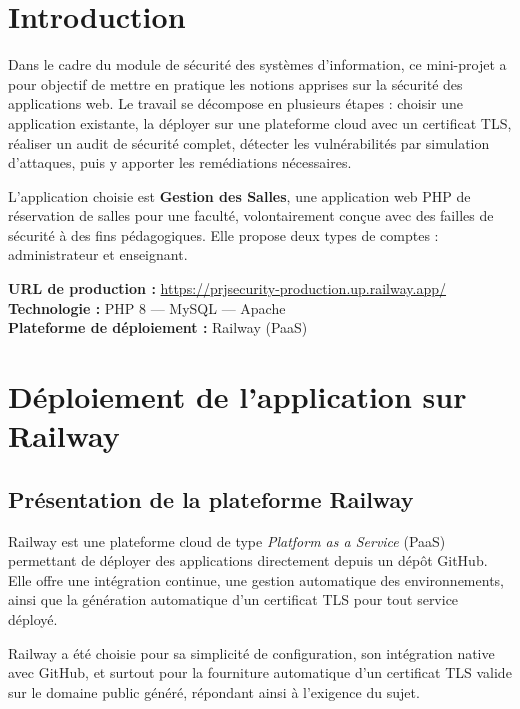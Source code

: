 ﻿\documentclass[12pt,a4paper]{report}
\begin{document}
\chapter*{Introduction}

Dans le cadre du module de sécurité des systèmes d'information, ce mini-projet a pour objectif
de mettre en pratique les notions apprises sur la sécurité des applications web. Le travail se
décompose en plusieurs étapes : choisir une application existante, la déployer sur une plateforme
cloud avec un certificat TLS, réaliser un audit de sécurité complet, détecter les vulnérabilités
par simulation d'attaques, puis y apporter les remédiations nécessaires.

L'application choisie est \textbf{Gestion des Salles}, une application web PHP de réservation
de salles pour une faculté, volontairement conçue avec des failles de sécurité à des fins
pédagogiques. Elle propose deux types de comptes : administrateur et enseignant.

\begin{infobox}
\textbf{URL de production :} \url{https://prjsecurity-production.up.railway.app/}\\
\textbf{Technologie :} PHP 8 --- MySQL --- Apache\\
\textbf{Plateforme de déploiement :} Railway (PaaS)
\end{infobox}


\newpage

\chapter{Déploiement de l'application sur Railway}

\section{Présentation de la plateforme Railway}

Railway est une plateforme cloud de type \textit{Platform as a Service} (PaaS) permettant de
déployer des applications directement depuis un dépôt GitHub. Elle offre une intégration continue,
une gestion automatique des environnements, ainsi que la génération automatique d'un certificat
TLS pour tout service déployé.

\begin{infobox}
Railway a été choisie pour sa simplicité de configuration, son intégration native avec GitHub,
et surtout pour la fourniture automatique d'un certificat TLS valide sur le domaine public généré,
répondant ainsi à l'exigence du sujet.
\end{infobox}
\end{document}
